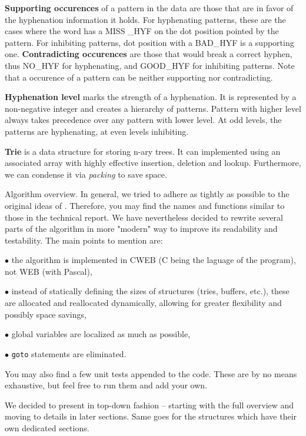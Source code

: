 {\bf Supporting occurences} of a pattern in the data are those that are in
favor of the hyphenation information it
holds. For hyphenating patterns, these are the cases where the word has a MISS%
\_HYF on the dot position pointed by the
pattern. For inhibiting patterns, dot position with a BAD\_HYF is a supporting
one. {\bf Contradicting occurences}
are those that would break a correct hyphen, thus NO\_HYF for hyphenating, and
GOOD\_HYF for inhibiting patterns. Note
that a occurence of a pattern can be neither supporting nor contradicting.

{\bf Hyphenation level} marks the strength of a hyphenation. It is represented
by a non-negative integer and creates
a hierarchy of patterns. Pattern with higher level always takes precedence over
any pattern with lower level. At odd
levels, the patterns are hyphenating, at even levels inhibiting.

{\bf Trie} is a data structure for storing n-ary trees. It can implemented
using an associated array with highly
effective insertion, deletion and lookup. Furthermore, we can condense it via {%
\it packing} to save space.

\fi

Algorithm overview.
In general, we tried to adhere as tightly as possible to the original ideas of %
\patgen. Therefore, you may find the
names and functions similar to those in the \patgen{} technical report. We have
nevertheless decided to rewrite several
parts of the algorithm in more "modern" way to improve its readability and
testability. The main points to mention are:

\item{$\bullet$} the algorithm is implemented in CWEB (C being the laguage of
the program), not WEB (with Pascal),
\item{$\bullet$} instead of statically defining the sizes of structures (tries,
buffers, etc.), these are allocated and
reallocated dynamically, allowing for greater flexibility and possibly space
savings,
\item{$\bullet$} global variables are localized as much as possible,
\item{$\bullet$} {\tt goto} statements are eliminated.

You may also find a few unit tests appended to the code. These are by no means
exhaustive, but feel free to run them
and add your own.

We decided to present \utfpatgen{} in top-down fashion -- starting with the
full overview and moving to details in later
sections. Same goes for the structures which have their own dedicated sections.

